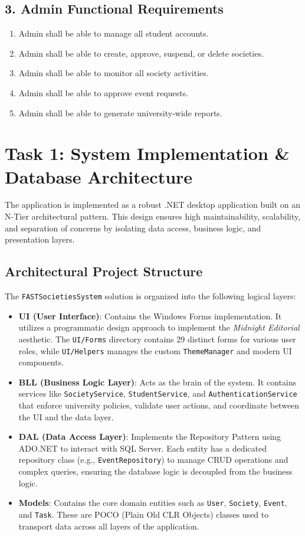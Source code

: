 \documentclass[12pt,a4paper]{article}
\begin{document}
\subsection{3. Admin Functional Requirements}
\begin{enumerate}
    \item Admin shall be able to manage all student accounts.
    \item Admin shall be able to create, approve, suspend, or delete societies.
    \item Admin shall be able to monitor all society activities.
    \item Admin shall be able to approve event requests.
    \item Admin shall be able to generate university-wide reports.
\end{enumerate}

\newpage
\section{Task 1: System Implementation \& Database Architecture}
The application is implemented as a robust .NET desktop application built on an N-Tier architectural pattern. This design ensures high maintainability, scalability, and separation of concerns by isolating data access, business logic, and presentation layers.

\subsection{Architectural Project Structure}
The \texttt{FASTSocietiesSystem} solution is organized into the following logical layers:

\begin{itemize}
    \item \textbf{UI (User Interface)}: Contains the Windows Forms implementation. It utilizes a programmatic design approach to implement the \textit{Midnight Editorial} aesthetic. The \texttt{UI/Forms} directory contains 29 distinct forms for various user roles, while \texttt{UI/Helpers} manages the custom \texttt{ThemeManager} and modern UI components.
    \item \textbf{BLL (Business Logic Layer)}: Acts as the brain of the system. It contains services like \texttt{SocietyService}, \texttt{StudentService}, and \texttt{AuthenticationService} that enforce university policies, validate user actions, and coordinate between the UI and the data layer.
    \item \textbf{DAL (Data Access Layer)}: Implements the Repository Pattern using ADO.NET to interact with SQL Server. Each entity has a dedicated repository class (e.g., \texttt{EventRepository}) to manage CRUD operations and complex queries, ensuring the database logic is decoupled from the business logic.
    \item \textbf{Models}: Contains the core domain entities such as \texttt{User}, \texttt{Society}, \texttt{Event}, and \texttt{Task}. These are POCO (Plain Old CLR Objects) classes used to transport data across all layers of the application.
\end{itemize}
\end{document}
